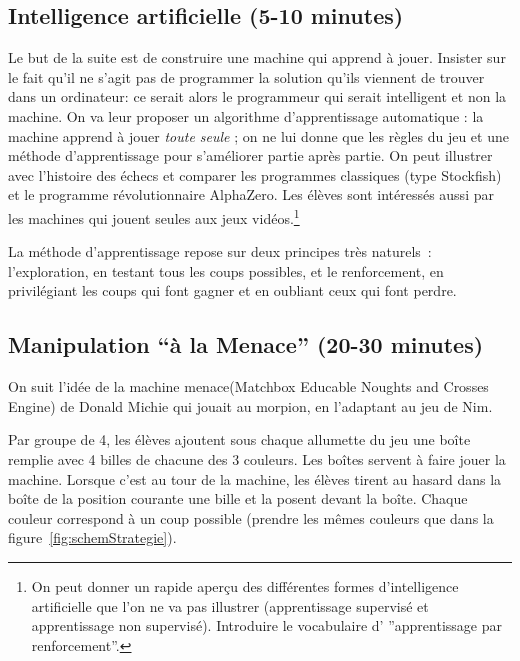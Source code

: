 \documentclass[a4paper,12pt]{article}
\begin{document}
\subsection{Intelligence artificielle (5-10 minutes)}
\label{intelligence-artificielle-5-10-minutes}

Le but de la suite est de construire une machine qui apprend à jouer. Insister sur le fait qu'il ne s'agit pas de programmer la solution qu'ils viennent de trouver dans un ordinateur: ce serait alors le programmeur qui serait intelligent et non la machine. On va leur proposer un algorithme d'apprentissage automatique : la machine apprend à jouer \emph{toute seule} ; on ne lui donne que les règles du jeu et une méthode d'apprentissage pour s'améliorer partie après partie. On peut illustrer avec l'histoire des échecs et comparer les programmes classiques (type Stockfish) et le programme révolutionnaire AlphaZero. Les élèves sont intéressés aussi par les machines qui jouent seules aux jeux vidéos.\footnote{On peut donner un rapide aperçu des différentes formes d'intelligence artificielle que l'on ne va pas illustrer (apprentissage supervisé et apprentissage non supervisé). Introduire le vocabulaire d' ''apprentissage par renforcement''.}

La méthode d'apprentissage repose sur deux principes très naturels~: l'exploration, en testant tous les coups possibles, et le renforcement, en privilégiant les coups qui font gagner et en oubliant ceux qui font perdre.


\subsection{Manipulation ``à la Menace'' (20-30 minutes)}
\label{manipulation-uxe0-la-menace-20-30-minutes}

On suit l'idée de la machine {\sc menace}(Matchbox Educable Noughts and Crosses Engine)  de Donald Michie \cite{Wiki, Michie} qui jouait au morpion, en l'adaptant au jeu de Nim.

Par groupe de 4, les élèves ajoutent sous chaque allumette du jeu une boîte remplie avec 4 billes de chacune des 3 couleurs. Les boîtes servent à faire jouer la machine. Lorsque c'est au tour de la machine, les élèves tirent au hasard dans la boîte de la position courante une bille et la posent devant la boîte. Chaque couleur correspond à un coup possible (prendre les mêmes couleurs que dans la figure~\ref{fig:schemStrategie}).
\end{document}
